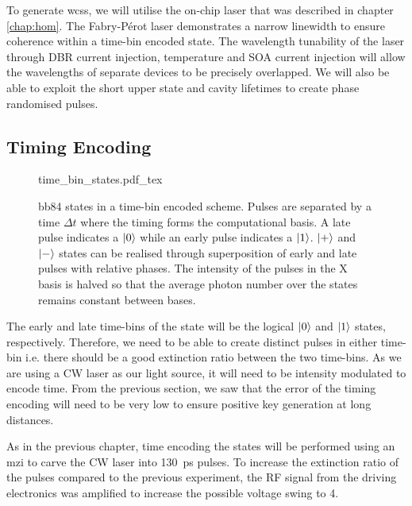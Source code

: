 To generate \acp{wcs}, we will utilise the on-chip laser that was described in chapter \ref{chap:hom}. The Fabry-P\'{e}rot laser demonstrates a narrow linewidth to ensure coherence within a time-bin encoded state. The wavelength tunability of the laser through \ac{DBR} current injection, temperature and \ac{SOA} current injection will allow the wavelengths of separate devices to be precisely overlapped. We will also be able to exploit the short upper state and cavity lifetimes to create phase randomised pulses.

\subsection{Timing Encoding}

\begin{figure}[t]
	\centering
	\small
	\def\svgwidth{0.9\textwidth} 
	{time_bin_states.pdf_tex}
	\caption[BB84 time-bin encoding]{\acs{bb84} states in a time-bin encoded scheme. Pulses are separated by a time $\Delta t$ where the timing forms the computational basis. A late pulse indicates a $\ket{0}$ while an early pulse indicates a $\ket{1}$. $\ket{+}$ and $\ket{-}$ states can be realised through superposition of early and late pulses with relative phases. The intensity of the pulses in the X basis is halved so that the average photon number over the states remains constant between bases.}
	\label{fig:BB84_time_bin}
\end{figure}

The early and late time-bins of the state will be the logical $\ket{0}$ and $\ket{1}$ states, respectively. Therefore, we need to be able to create distinct pulses in either time-bin i.e. there should be a good extinction ratio between the two time-bins. As we are using a \ac{CW} laser as our light source, it will need to be intensity modulated to encode time. From the previous section, we saw that the error of the timing encoding will need to be very low to ensure positive key generation at long distances.

As in the previous chapter, time encoding the states will be performed using an \acl{mzi} to carve the \ac{CW} laser into \SI{130}{ps} pulses. To increase the extinction ratio of the pulses compared to the previous experiment, the RF signal from the driving electronics was amplified to increase the possible voltage swing to \SI{4}{\Vpp}. 


